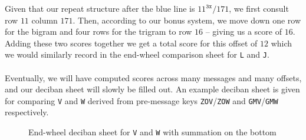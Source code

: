 \noindent Given that our repeat structure after the blue line is
$11^\texttt{3x}/171$, we first consult row $11$ column $171$. Then,
according to our bonus system, we move down one row for the bigram
and four rows for the trigram to row $16$ -- giving us a score of
$16$. Adding these two scores together we get a total score for
this offset of $12$ which we would similarly record in the
end-wheel comparison sheet for \texttt{L} and \texttt{J}.
\\\\Eventually, we will have computed scores across many messages
and many offsets, and our deciban sheet will slowly be filled
out. An example deciban sheet is given for comparing \texttt{V}
and \texttt{W} derived from pre-message keys
\texttt{ZOV}/\texttt{ZOW} and \texttt{GMV}/\texttt{GMW} respectively.
\begin{figure}[H]
  \begin{center}
  \end{center}

  \caption{End-wheel deciban sheet for \texttt{V} and \texttt{W} with
  summation on the bottom }
\end{figure}
